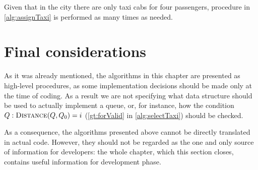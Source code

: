 Given that in the city there are only taxi cabs for four passengers, procedure in \cref{alg:assignTaxi} is performed as many times as needed.


\section{Final considerations}
As it was already mentioned, the algorithms in this chapter are presented as \mbox{high-level} procedures, as some implementation decisions should be made only at the time of coding. As a result we are not specifying what data structure should be used to actually implement a queue, or, for instance, how the condition $Q : \Call{Distance}{Q,Q_0}=i$ (\cref{gt:forValid} in \cref{alg:selectTaxi}) should be checked.

As a consequence, the algorithms presented above cannot be directly translated in actual code. However, they should not be regarded as the one and only source of information for developers: the whole chapter, which this section closes, contains useful information for development phase.


